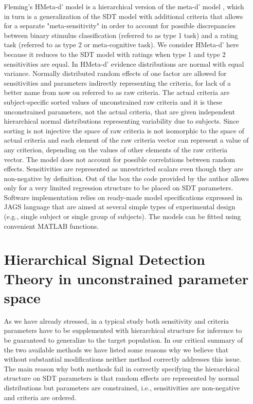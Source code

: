 \documentclass[oneside,a4paper]{article}
\begin{document}
Fleming's \citeyear{hmetad} HMeta-d' model is a hierarchical version
of the meta-d' model \cite{maniscalco2012signal}, which in turn is a
generalization of the SDT model with additional criteria that allows
for a separate "meta-sensitivity" in order to account for possible
discrepancies between binary stimulus classification (referred to as
type 1 task) and a rating task (referred to as type 2 or
meta-cognitive task). We consider HMeta-d' here because it reduces to
the SDT model with ratings when type 1 and type 2 sensitivities are
equal. In HMeta-d' evidence distributions are normal with equal
variance. Normally distributed random effects of one factor are
allowed for sensitivities and parameters indirectly representing the
criteria, for lack of a better name from now on referred to as raw
criteria. The actual criteria are subject-specific sorted values of
unconstrained raw criteria and it is these unconstrained parameters,
not the actual criteria, that are given independent hierarchical
normal distributions representing variability due to subjects. Since
sorting is not injective the space of raw criteria is not isomorphic
to the space of actual criteria and each element of the raw criteria
vector can represent a value of any criterion, depending on the values
of other elements of the raw criteria vector. The model does not
account for possible correlations between random
effects. Sensitivities are represented as unrestricted scalars even
though they are non-negative by definition. Out of the box the code
provided by the author allows only for a very limited regression
structure to be placed on SDT parameters. Software implementation
relies on ready-made model specifications expressed in JAGS language
that are aimed at several simple types of experimental design (e.g.,
single subject or single group of subjects). The models can be fitted
using convenient MATLAB functions.

\section{Hierarchical Signal Detection Theory in unconstrained
  parameter space}

As we have already stressed, in a typical study both sensitivity and
criteria parameters have to be supplemented with hierarchical
structure for inference to be guaranteed to generalize to the target
population. In our critical summary of the two available methods we
have listed some reasons why we believe that without substantial
modifications neither method correctly addresses this issue. The main
reason why both methods fail in correctly specifying the hierarchical
structure on SDT parameters is that random effects are represented by
normal distributions but parameters are constrained, i.e.,
sensitivities are non-negative and criteria are ordered.
\end{document}
